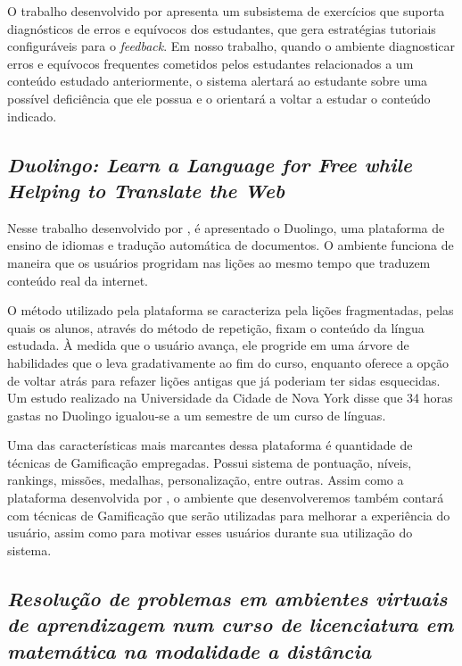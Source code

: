 O trabalho desenvolvido por  apresenta um subsistema de exerc\'icios que suporta diagn\'osticos de erros e equ\'ivocos dos estudantes, que 
gera estrat\'egias tutoriais configur\'aveis para o \textit{feedback}. Em nosso trabalho, quando o ambiente diagnosticar erros e equ\'ivocos frequentes cometidos pelos estudantes relacionados a 
um conte\'udo estudado anteriormente, o sistema alertar\'a ao estudante sobre uma poss\'ivel defici\^encia que ele possua e o orientar\'a a voltar a estudar o conte\'udo indicado.


\subsection{\textit{Duolingo: Learn a Language for Free while Helping to Translate the Web}}\label{trabalho_relacionados_duolingo}

Nesse trabalho desenvolvido por , \'e apresentado o Duolingo, uma plataforma de ensino de idiomas e tradu\c{c}\~ao autom\'atica de documentos. O ambiente funciona de 
maneira que os usuários progridam nas lições ao mesmo tempo que traduzem conteúdo real da internet. 

O método utilizado pela plataforma se caracteriza pela li\c{c}\~oes fragmentadas, pelas quais os 
alunos, atrav\'es do m\'etodo de repeti\c{c}\~ao, fixam o conte\'udo da língua estudada. \`A medida que o usu\'ario avan\c{c}a, ele progride em uma \'arvore de habilidades que o leva gradativamente 
ao fim do curso, enquanto oferece a op\c{c}\~ao de voltar atr\'as para refazer li\c{c}\~oes antigas que j\'a poderiam ter sidas esquecidas. Um estudo realizado na Universidade da Cidade de Nova York 
\cite{vesselinov2012duolingo} disse que 34 horas gastas no Duolingo igualou-se a um semestre de um curso de l\'inguas.

Uma das características mais marcantes dessa plataforma \'e quantidade de técnicas de Gamifica\c{c}\~ao empregadas. Possui sistema de pontua\c{c}\~ao, n\'iveis, rankings, miss\~oes, medalhas, 
personaliza\c{c}\~ao, entre outras. Assim como a plataforma desenvolvida por , o ambiente que desenvolveremos tamb\'em contar\'a com t\'ecnicas de Gamifica\c{c}\~ao que 
ser\~ao utilizadas para melhorar a experi\^encia do usu\'ario, assim como para motivar esses usu\'arios durante sua utiliza\c{c}\~ao do sistema.

\subsection{\textit{Resolução de problemas em ambientes virtuais de aprendizagem num curso de licenciatura em matemática na modalidade a distância}}

